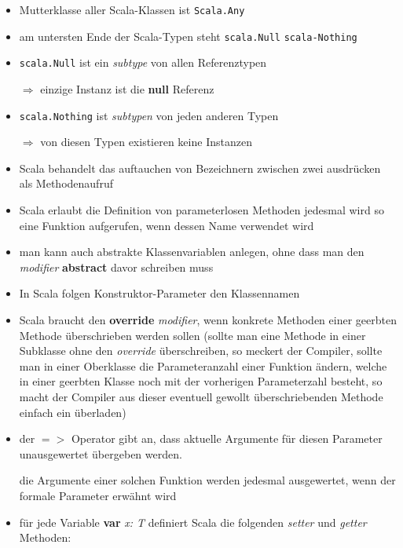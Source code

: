 \begin{itemize}
  \item Mutterklasse aller Scala-Klassen ist \texttt{Scala.Any}
  \item am untersten Ende der Scala-Typen steht \texttt{scala.Null}
  \und \texttt{scala-Nothing}
  \item \texttt{scala.Null} ist ein \textit{subtype} von allen Referenztypen
  
  $\Rightarrow$ einzige Instanz ist die \textbf{null} Referenz
  \item \texttt{scala.Nothing} ist \textit{subtypen} von jeden anderen Typen
  
  $\Rightarrow$ von diesen Typen existieren keine Instanzen
  \item Scala behandelt das auftauchen von Bezeichnern zwischen zwei
  ausdrücken als Methodenaufruf
  \item Scala erlaubt die Definition von parameterlosen Methoden \und jedesmal
  wird so eine Funktion aufgerufen, wenn dessen Name verwendet wird
  \item man kann auch abstrakte Klassenvariablen anlegen, ohne dass man den
  \textit{modifier} \textbf{abstract} davor schreiben muss
  \item In Scala folgen Konstruktor-Parameter den Klassennamen
  
  \item Scala braucht den \textbf{override} \textit{modifier}, wenn konkrete
  Methoden einer geerbten Methode überschrieben werden sollen (sollte man eine
  Methode in einer Subklasse ohne den \textit{override} überschreiben, so meckert
  der Compiler, sollte man in einer Oberklasse die Parameteranzahl einer Funktion
  ändern, welche in einer geerbten Klasse noch mit der vorherigen Parameterzahl
  besteht, so macht der Compiler aus dieser eventuell gewollt überschriebenden
  Methode einfach ein überladen)
  \item der $=>$ Operator gibt an, dass aktuelle Argumente für diesen Parameter
  unausgewertet übergeben werden.
    
  die Argumente einer solchen Funktion werden jedesmal ausgewertet, wenn der
  formale Parameter erwähnt wird
  
    

  \item für jede Variable \textbf{var} \textit{x: T} definiert Scala
  die folgenden \textit{setter} und \textit{getter} Methoden:
  

\end{itemize}
